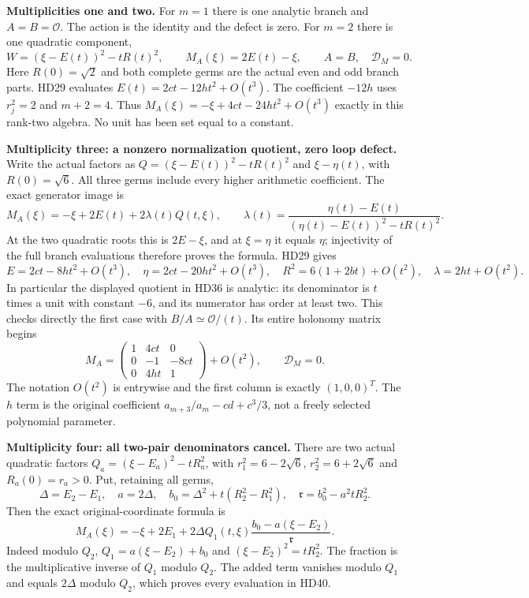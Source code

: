 \documentclass[11pt,a4paper]{article}
\theoremstyle{definition}\newtheorem{definition}[theorem]{Definition}
\begin{document}
\HD\textbf{Multiplicities one and two.}
For $m=1$ there is one analytic branch and $A=B=\mathcal O$.
The action is the identity and the defect is zero.
For $m=2$ there is one quadratic component,
\[
 W=(\xi-E(t))^2-tR(t)^2,\qquad
 M_A(\xi)=2E(t)-\xi,\qquad A=B,\quad\mathcal D_M=0 .
 \tag{HD35}
\]
Here $R(0)=\sqrt2$ and both complete germs are the actual
even and odd branch parts. HD29 evaluates
$E(t)=2ct-12ht^2+O(t^3)$.
The coefficient $-12h$ uses $r_j^2=2$ and $m+2=4$.
Thus $M_A(\xi)=-\xi+4ct-24ht^2+O(t^3)$ exactly in this rank-two
algebra. No unit has been set equal to a constant.

\HD\textbf{Multiplicity three: a nonzero normalization quotient, zero loop defect.}
Write the actual factors as
$Q=(\xi-E(t))^2-tR(t)^2$ and $\xi-\eta(t)$, with $R(0)=\sqrt6$.
All three germs include every higher arithmetic coefficient.
The exact generator image is
\[
 M_A(\xi)=-\xi+2E(t)+2\lambda(t)Q(t,\xi),\qquad
 \lambda(t)=\frac{\eta(t)-E(t)}
                {(\eta(t)-E(t))^2-tR(t)^2}.
 \tag{HD36}\label{hd:m3}
\]
At the two quadratic roots this is $2E-\xi$, and at $\xi=\eta$
it equals $\eta$; injectivity of the full branch evaluations
therefore proves the formula. HD29 gives
\[
 E=2ct-8ht^2+O(t^3),\quad
 \eta=2ct-20ht^2+O(t^3),\quad
 R^2=6(1+2bt)+O(t^2),\quad
 \lambda=2ht+O(t^2).
 \tag{HD37}
\]
In particular the displayed quotient in HD36 is analytic: its
denominator is $t$ times a unit with constant $-6$, and its
numerator has order at least two. This checks directly the first
case with $B/A\simeq\mathcal O/(t)$.
Its entire holonomy matrix begins
\[
 M_A=
 \begin{pmatrix}
  1&4ct&0\\
  0&-1&-8ct\\
  0&4ht&1
 \end{pmatrix}
       +O(t^2),\qquad \mathcal D_M=0 .
 \tag{HD38}
\]
The notation $O(t^2)$ is entrywise and the first column is exactly
$(1,0,0)^T$. The $h$ term is the original coefficient
$a_{m+3}/a_m-cd+c^3/3$, not a freely selected polynomial parameter.

\HD\textbf{Multiplicity four: all two-pair denominators cancel.}
There are two actual quadratic factors
$Q_a=(\xi-E_a)^2-tR_a^2$, with
$r_1^2=6-2\sqrt6$, $r_2^2=6+2\sqrt6$ and $R_a(0)=r_a>0$.
Put, retaining all germs,
\[
 \Delta=E_2-E_1,\quad a=2\Delta,\quad
 b_0=\Delta^2+t(R_2^2-R_1^2),\quad
 \mathfrak r=b_0^2-a^2tR_2^2 .
 \tag{HD39}
\]
Then the exact original-coordinate formula is
\[
 M_A(\xi)=-\xi+2E_1+
     2\Delta Q_1(t,\xi)
       \frac{b_0-a(\xi-E_2)}{\mathfrak r}.
 \tag{HD40}\label{hd:m4}
\]
Indeed modulo $Q_2$,
$Q_1=a(\xi-E_2)+b_0$ and $(\xi-E_2)^2=tR_2^2$.
The fraction is the multiplicative inverse of $Q_1$ modulo $Q_2$.
The added term vanishes modulo $Q_1$ and equals $2\Delta$
modulo $Q_2$, which proves every evaluation in HD40.
\end{document}
